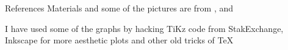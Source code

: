 \documentclass{beamer}
\begin{document}
\begin{frame}{References}
	Materials and some of the pictures are from \citep{calin}, and \citep{murphyintro}
	\printbibliography 	
	
	I have used some of the graphs by hacking TiKz code from StakExchange, Inkscape for more aesthetic plots and other old tricks of \TeX
	
\end{frame}
\end{document}
